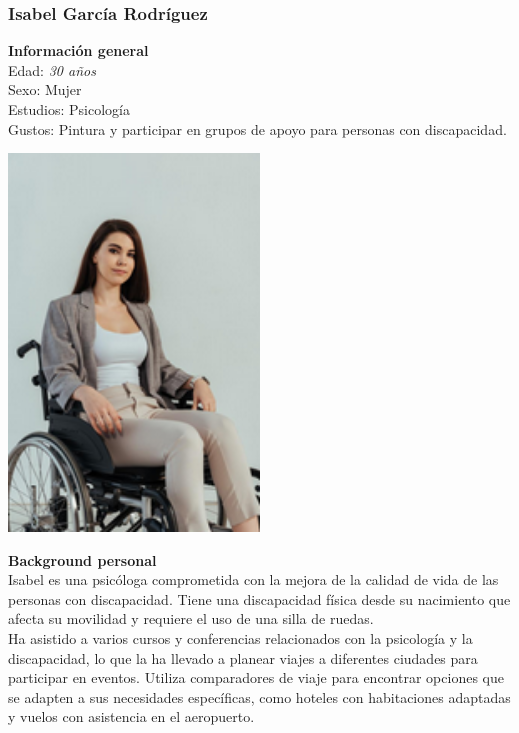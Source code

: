 \subsubsection{Isabel García Rodríguez}
\begin{minipage}{0.4\textwidth}
    \textbf{Información general} \\

    Edad: \textit{30 años} \\
    Sexo: Mujer \\
    Estudios: Psicología \\
    Gustos: Pintura y participar en grupos de apoyo para personas con discapacidad. \\
\end{minipage}
\hfill
\begin{minipage}{0.4\textwidth}
    \includegraphics[width=0.5\textwidth]{Imagenes/Personas/Isabel.png}
\end{minipage}

\textbf{Background personal} \\

Isabel es una psicóloga comprometida con la mejora de la calidad de vida de las personas con discapacidad. Tiene una discapacidad física desde su nacimiento que afecta su movilidad y requiere el uso de una silla de ruedas. \\

Ha asistido a varios cursos y conferencias relacionados con la psicología y la discapacidad, lo que la ha llevado a planear viajes a diferentes ciudades para participar en eventos. Utiliza comparadores de viaje para encontrar opciones que se adapten a sus necesidades específicas, como hoteles con habitaciones adaptadas y vuelos con asistencia en el aeropuerto. \\


